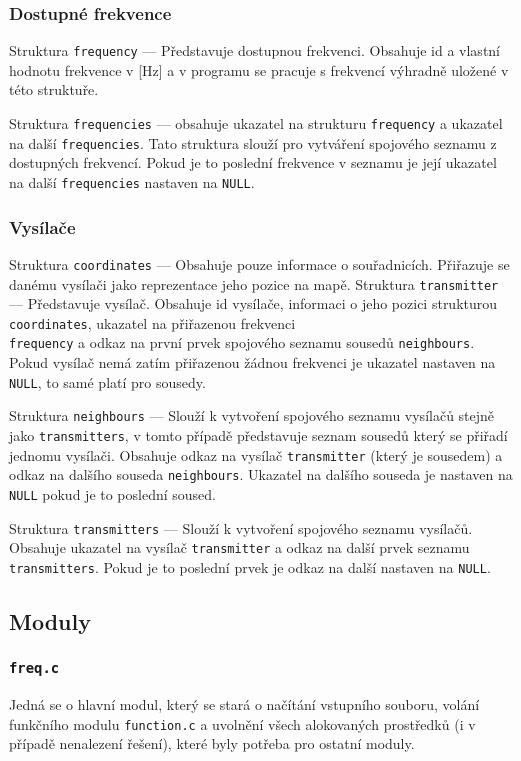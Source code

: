 \documentclass[12pt]{report}
\begin{document}
\subsubsection{Dostupné frekvence}
Struktura \texttt{frequency} --- Představuje dostupnou frekvenci. Obsahuje id a vlastní hodnotu frekvence v [Hz] a v programu se pracuje s frekvencí výhradně uložené v této struktuře.

Struktura \texttt{frequencies} --- obsahuje ukazatel na strukturu \texttt{frequency} a ukazatel na další \texttt{frequencies}. Tato struktura slouží pro vytváření spojového seznamu z dostupných frekvencí. Pokud je to poslední frekvence v seznamu je její ukazatel na další \texttt{frequencies} nastaven na \texttt{NULL}.

\subsubsection{Vysílače}
Struktura \texttt{coordinates} --- Obsahuje pouze informace o souřadnicích. Přiřazuje se danému vysílači jako reprezentace jeho pozice na mapě.
\pagebreak
Struktura \texttt{transmitter} --- Představuje vysílač. Obsahuje id vysílače,  informaci o jeho pozici strukturou \texttt{coordinates}, ukazatel na přiřazenou frekvenci \\ \texttt{frequency} a odkaz na první prvek spojového seznamu sousedů \texttt{neighbours}. Pokud vysílač nemá zatím přiřazenou žádnou frekvenci je ukazatel nastaven na \texttt{NULL}, to samé platí pro sousedy.

Struktura  \texttt{neighbours} --- Slouží k vytvoření spojového seznamu vysílačů stejně jako \texttt{transmitters}, v tomto případě představuje seznam sousedů který se přiřadí jednomu vysílači. Obsahuje odkaz na vysílač \texttt{transmitter} (který je sousedem) a odkaz na dalšího souseda \texttt{neighbours}. Ukazatel na dalšího souseda je nastaven na \texttt{NULL} pokud je to poslední soused.

Struktura  \texttt{transmitters} --- Slouží k vytvoření spojového seznamu vysílačů. Obsahuje ukazatel na vysílač \texttt{transmitter} a odkaz na další prvek seznamu \texttt{transmitters}. Pokud je to poslední prvek je odkaz na další nastaven na \texttt{NULL}.

\subsection{Moduly}
\setlength{\parskip}{1pt}

\subsubsection{\Large{\texttt{freq.c}}}
Jedná se o hlavní modul, který se stará o načítání vstupního souboru, volání funkčního modulu \verb|function.c| a uvolnění všech alokovaných prostředků (i v případě nenalezení řešení), které byly potřeba pro ostatní moduly.
\end{document}
